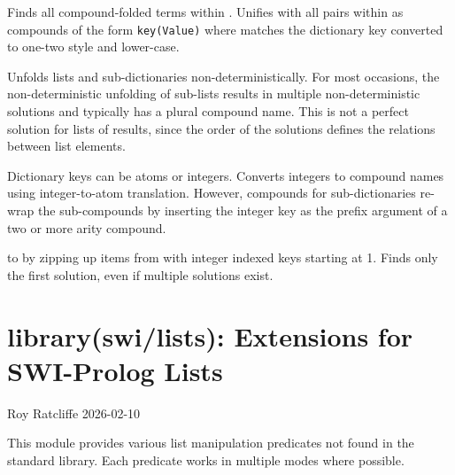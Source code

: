 \begin{description}
Finds all compound-folded terms within . Unifies with all pairs
within  as compounds of the form \verb$key(Value)$ where  matches
the dictionary key converted to one-two style and lower-case.

Unfolds lists and sub-dictionaries non-deterministically. For most
occasions, the non-deterministic unfolding of sub-lists results in
multiple non-deterministic solutions and typically has a plural
compound name. This is not a perfect solution for lists of results,
since the order of the solutions defines the relations between list
elements.

Dictionary keys can be atoms or integers. Converts integers to
compound names using integer-to-atom translation. However, compounds
for sub-dictionaries re-wrap the sub-compounds by inserting the
integer key as the prefix argument of a two or more arity compound.

 to  by zipping up items from  with integer indexed keys
starting at 1. Finds only the first solution, even if multiple
solutions exist.
\end{description}

\chapter{library(swi/lists): Extensions for SWI-Prolog Lists}\label{sec:lists}

\begin{tags}
Roy Ratcliffe
2026-02-10
\end{tags}

This module provides various list manipulation predicates not found
in the standard library. Each predicate works in multiple modes where
possible.\vspace{0.7cm}

